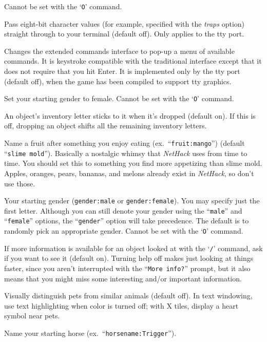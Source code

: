 Cannot be set with the `{\tt O}' command.
\item[\ib{eight\_bit\_tty}]
Pass eight-bit character values (for example, specified with the {\it
traps \/} option) straight through to your terminal (default off).
Only applies to the tty port.
\item[\ib{extmenu}]
Changes the extended commands interface to pop-up a menu of available commands.
It is keystroke compatible with the traditional interface except that it does
not require that you hit Enter.  It is implemented only by the tty port 
(default off), when the game has been compiled to support tty graphics.
\item[\ib{female}]
Set your starting gender to female. Cannot be set with the `{\tt O}' command.
\item[\ib{fixinv}]
An object's inventory letter sticks to it when it's dropped (default on).
If this is off, dropping an object shifts all the remaining inventory letters.
\item[\ib{fruit}]
Name a fruit after something you enjoy eating (ex.\ ``{\tt fruit:mango}'')
(default ``{\tt slime mold}''). Basically a nostalgic whimsy that
{\it NetHack\/} uses from time to time.  You should set this to something you
find more appetizing than slime mold.  Apples, oranges, pears, bananas, and
melons already exist in {\it NetHack}, so don't use those.
\item[\ib{gender}]
Your starting gender ({\tt gender:male} or {\tt gender:female}).
You may specify just the first letter.  Although you can
still denote your gender using the ``{\tt male}'' and ``{\tt female}''
options, the ``{\tt gender}'' option will take precedence.
The default is to randomly pick an appropriate gender.
Cannot be set with the `{\tt O}' command.
\item[\ib{help}]
If more information is available for an object looked at
with the `{\tt /}' command, ask if you want to see it (default on).
Turning help off makes just looking at things faster, since you aren't
interrupted with the ``{\tt More info?}'' prompt, but it also means that you
might miss some interesting and/or important information.
\item[\ib{hilite\_pet}]
Visually distinguish pets from similar animals (default off).
In text windowing, use text highlighting when color is turned off;
with X tiles, display a heart symbol near pets.
\item[\ib{horsename}]
Name your starting horse (ex.\ ``{\tt horsename:Trigger}'').
